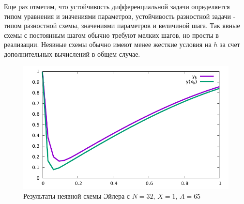 Еще раз отметим, что устойчивость дифференциальной задачи определяется
типом уравнения и значениями параметров, устойчивость разностной задачи -
типом разностной схемы, значениями параметров и величиной шага.
Так явные схемы с постоянным шагом обычно требуют мелких шагов, но просты в реализации.
Неявные схемы обычно имеют менее жесткие условия на $h$ за счет дополнительных вычислений в общем случае.

\begin{figure}[h]
  \centering
  \includegraphics[scale=0.4]{16/ImplicitCosineScheme.pdf}
  \caption{Результаты неявной схемы Эйлера с $N=32$, $X=1$, $A=65$}
\end{figure}
